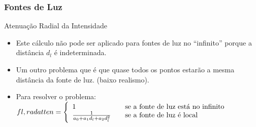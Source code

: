 \documentclass{beamer}
\begin{document}
\begin{frame}
\frametitle{Fontes de Luz}

	\begin{block}{Atenuação Radial da Intensidade}
		\begin{itemize}
			\item Este cálculo não pode ser aplicado para fontes de luz no ``infinito'' porque a distância $d_l$ é indeterminada.
			\item Um outro problema que é que quase todos os pontos estarão a mesma distância da fonte de luz. (baixo realismo).
			\item Para resolver o problema: \\
			$ fl,{radatten} = \left\{ 
  					\begin{array}{l l}
   						 1 & \quad \text{se a fonte de luz está no infinito}\\
    						\frac{1}{a_0 + a_1d_l + a_2d^{2}_{l}} & \quad \text{se a fonte de luz é local}
  					\end{array} \right.$ 
		\end{itemize}
	\end{block}
\end{frame}


\end{document}
